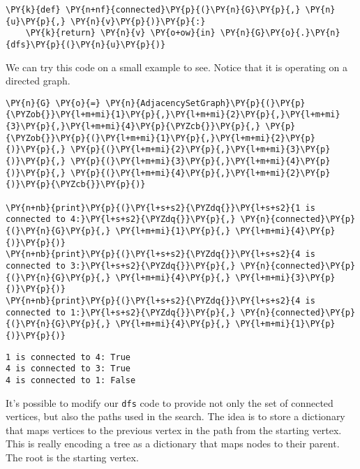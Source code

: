 \begin{Verbatim}[commandchars=\\\{\}]
\PY{k}{def} \PY{n+nf}{connected}\PY{p}{(}\PY{n}{G}\PY{p}{,} \PY{n}{u}\PY{p}{,} \PY{n}{v}\PY{p}{)}\PY{p}{:}
    \PY{k}{return} \PY{n}{v} \PY{o+ow}{in} \PY{n}{G}\PY{o}{.}\PY{n}{dfs}\PY{p}{(}\PY{n}{u}\PY{p}{)}
\end{Verbatim}



We can try this code on a small example to see.
Notice that it is operating on a directed graph.


\begin{Verbatim}[commandchars=\\\{\}]
\PY{n}{G} \PY{o}{=} \PY{n}{AdjacencySetGraph}\PY{p}{(}\PY{p}{\PYZob{}}\PY{l+m+mi}{1}\PY{p}{,}\PY{l+m+mi}{2}\PY{p}{,}\PY{l+m+mi}{3}\PY{p}{,}\PY{l+m+mi}{4}\PY{p}{\PYZcb{}}\PY{p}{,} \PY{p}{\PYZob{}}\PY{p}{(}\PY{l+m+mi}{1}\PY{p}{,}\PY{l+m+mi}{2}\PY{p}{)}\PY{p}{,} \PY{p}{(}\PY{l+m+mi}{2}\PY{p}{,}\PY{l+m+mi}{3}\PY{p}{)}\PY{p}{,} \PY{p}{(}\PY{l+m+mi}{3}\PY{p}{,}\PY{l+m+mi}{4}\PY{p}{)}\PY{p}{,} \PY{p}{(}\PY{l+m+mi}{4}\PY{p}{,}\PY{l+m+mi}{2}\PY{p}{)}\PY{p}{\PYZcb{}}\PY{p}{)}

\PY{n+nb}{print}\PY{p}{(}\PY{l+s+s2}{\PYZdq{}}\PY{l+s+s2}{1 is connected to 4:}\PY{l+s+s2}{\PYZdq{}}\PY{p}{,} \PY{n}{connected}\PY{p}{(}\PY{n}{G}\PY{p}{,} \PY{l+m+mi}{1}\PY{p}{,} \PY{l+m+mi}{4}\PY{p}{)}\PY{p}{)}
\PY{n+nb}{print}\PY{p}{(}\PY{l+s+s2}{\PYZdq{}}\PY{l+s+s2}{4 is connected to 3:}\PY{l+s+s2}{\PYZdq{}}\PY{p}{,} \PY{n}{connected}\PY{p}{(}\PY{n}{G}\PY{p}{,} \PY{l+m+mi}{4}\PY{p}{,} \PY{l+m+mi}{3}\PY{p}{)}\PY{p}{)}
\PY{n+nb}{print}\PY{p}{(}\PY{l+s+s2}{\PYZdq{}}\PY{l+s+s2}{4 is connected to 1:}\PY{l+s+s2}{\PYZdq{}}\PY{p}{,} \PY{n}{connected}\PY{p}{(}\PY{n}{G}\PY{p}{,} \PY{l+m+mi}{4}\PY{p}{,} \PY{l+m+mi}{1}\PY{p}{)}\PY{p}{)}
\end{Verbatim}

\begin{Verbatim}
1 is connected to 4: True
4 is connected to 3: True
4 is connected to 1: False
\end{Verbatim}


It's possible to modify our \texttt{dfs} code to provide not only the set of connected vertices, but also the paths used in the search.
The idea is to store a dictionary that maps vertices to the previous vertex in the path from the starting vertex.
This is really encoding a tree as a dictionary that maps nodes to their parent.
The root is the starting vertex.


